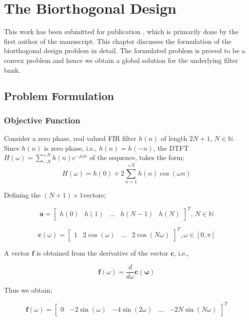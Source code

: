 \chapter{The Biorthogonal Design}
This work has been submitted for publication \cite{CSSP}, which is primarily done by the first author of the manuscript. This chapter discusses the formulation of the biorthogonal design problem in detail. The formulated problem is proved to be a convex problem and hence we obtain a global solution for the underlying filter bank.
\section{\label{sec:problem_formulation}Problem Formulation}
\subsection{\label{sub:objective function}Objective Function}
Consider a zero phase, real valued FIR filter $h(n)$ of length
$2N+1$, $N\in\mathbb{N}$. Since $h(n)$ is zero phase, i.e., $h(n)=h(-n)$,
the DTFT $H(\omega)=\sum_{-N}^{+N}h(n)e^{-j\omega n}$ of the sequence,
takes the form;
\begin{equation}
H(\omega)=h(0)+2\sum_{n=1}^{+N}h(n)\cos(\omega n)\label{eq:frequencyResponse}\end{equation}


Defining the $(N+1)\times1$vectors;

\begin{equation}
\mathbf{a}=\left[\begin{array}{ccccc}
h(0) & h(1) & \ldots & h(N-1) & h(N)\end{array}\right]^{T},\, N\in\mathbb{N}\label{eq:halfLengthFilterVector}\end{equation}


\begin{equation}
\mathbf{c}(\omega)=\left[\begin{array}{ccccc}
1 & 2\cos(\omega) & \ldots & 2\cos(N\omega)\end{array}\right]^{T},\omega\in[0,\pi]\label{eq:CosVector}\end{equation}


A vector \textbf{$\mathbf{f}$} is obtained from the derivative of
the vector $\mathbf{c}$, i.e.,

\[
\mathbf{f}(\omega)=\frac{d}{d\omega}\mathbf{c(\omega)}\]


Thus we obtain;

\begin{equation}
\mathbf{f}(\omega)=\left[\begin{array}{ccccc}
0 & -2\sin(\omega) & -4\sin(2\omega) & \ldots & -2N\sin(N\omega)\end{array}\right]^{T}\label{eq:SineVector}\end{equation}


